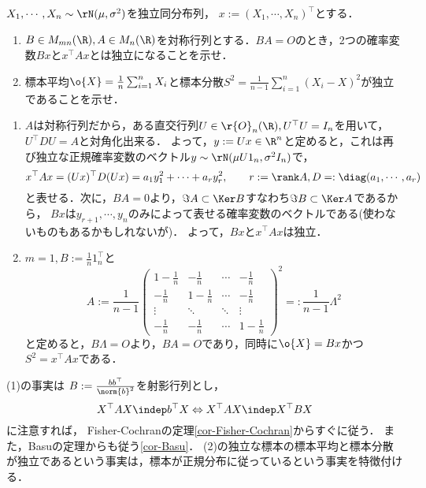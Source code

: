 \documentclass[uplatex,dvipdfmx]{jsreport}
\begin{document}
\begin{proposition}
    $X_1,\cdots,X_n\sim\rN(\mu,\sigma^2)$を独立同分布列，
    $x:=(X_1,\cdots,X_n)^\top$とする．
    \begin{enumerate}
        \item $B\in M_{mn}(\R),A\in M_n(\R)$を対称行列とする．$BA=O$のとき，2つの確率変数$Bx$と$x^\top Ax$とは独立になることを示せ．
        \item 標本平均$\o{X}=\frac{1}{n}\sum_{i=1}^nX_i$と標本分散$S^2=\frac{1}{n-1}\sum_{i=1}^n(X_i-X)^2$が独立であることを示せ．
    \end{enumerate}
\end{proposition}
\begin{Proof}\mbox{}
    \begin{enumerate}
        \item $A$は対称行列だから，ある直交行列$U\in \r{O}_n(\R),U^\top U=I_n$を用いて，$U^\top DU=A$と対角化出来る．
        よって，$y:=Ux\in\R^n$と定めると，これは再び独立な正規確率変数のベクトル$y\sim\rN(\mu U1_n,\sigma^2I_n)$で，
        \[x^\top Ax=(Ux)^\top D(Ux)=a_1y_1^2+\cdots+a_ry_r^2,\qquad r:=\rank A,D=:\diag(a_1,\cdots,a_r)\]
        と表せる．次に，$BA=0$より，$\Im A\subset\Ker B$すなわち$\Im B\subset\Ker A$であるから，
        $Bx$は$y_{r+1},\cdots,y_{n}$のみによって表せる確率変数のベクトルである(使わないものもあるかもしれないが)．
        よって，$Bx$と$x^\top Ax$は独立．
        \item $m=1,B:=\frac{1}{n}1_n^\top$と
        \[A:=\frac{1}{n-1}\begin{pmatrix}1-\frac{1}{n}&-\frac{1}{n}&\cdots&-\frac{1}{n}\\-\frac{1}{n}&1-\frac{1}{n}&\cdots&-\frac{1}{n}\\\vdots&\ddots&\ddots&\vdots\\-\frac{1}{n}&-\frac{1}{n}&\cdots&1-\frac{1}{n}\end{pmatrix}^2=:\frac{1}{n-1}\Lambda^2\]
        と定めると，$B\Lambda=O$より，$BA=O$であり，同時に$\o{X}=Bx$かつ$S^2=x^\top Ax$である．
    \end{enumerate}
\end{Proof}
\begin{remarks}
    (1)の事実は
    $B:=\frac{bb^\top}{\norm{b}^2}$を射影行列とし，
    \[X^\top AX\indep b^\top X\Leftrightarrow X^\top AX\indep X^\top BX\]
    に注意すれば，
    Fisher-Cochranの定理\ref{cor-Fisher-Cochran}からすぐに従う．
    また，Basuの定理からも従う\ref{cor-Basu}．
    (2)の独立な標本の標本平均と標本分散が独立であるという事実は，標本が正規分布に従っているという事実を特徴付ける\cite{Kawata-Sakamoto49}．
\end{remarks}
\end{document}
